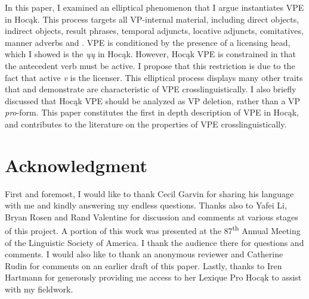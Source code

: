 \documentclass[output=paper]{LSP/langsci}
\begin{document}
 
In this paper, I examined an elliptical phenomenon that I argue instantiates VPE in Hocąk. This process targets all VP-internal material, including direct objects, indirect objects, result phrases, temporal adjuncts, locative adjuncts, comitatives, manner adverbs and  . VPE is conditioned by the presence of a licensing head, which I showed is the  \emph{ųų} in Hocąk. However, Hocąk VPE is constrained in that the antecedent verb must be active. I propose that this restriction is due to the fact that active \emph{v} is the licenser. This elliptical process displays many other traits that \citet{Goldberg2005} and \citet{Fortin2007} demonstrate are characteristic of VPE crosslinguistically. I also briefly discussed that Hocąk VPE should be analyzed as VP deletion, rather than a VP \emph{pro}-form. This paper constitutes the first in depth description of VPE in Hocąk, and contributes to the literature on the properties of VPE crosslinguistically. 
 

\section*{Acknowledgment}

First and foremost, I would like to thank Cecil Garvin for sharing his language with me and kindly answering my endless questions. Thanks also to Yafei Li, Bryan Rosen and Rand Valentine for discussion and comments at various stages of this project. A portion of this work was presented at the 87\textsuperscript{th} Annual Meeting of the Linguistic Society of America. I thank the audience there for questions and comments. I would also like to thank an anonymous reviewer and Catherine Rudin for comments on an earlier draft of this paper. Lastly, thanks to Iren Hartmann for generously providing me access to her Lexique Pro Hocąk  to assist with my fieldwork.
\end{document}
